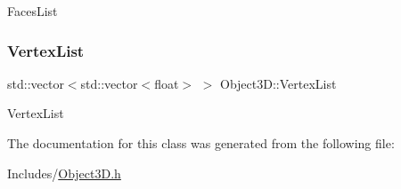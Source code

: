 Faces\+List \mbox{\label{class_object3_d_a45805c0be9963e17c592e5f5c2b972d7}} 
\subsubsection{\texorpdfstring{Vertex\+List}{VertexList}}
{\footnotesize\ttfamily std\+::vector$<$std\+::vector$<$float$>$ $>$ Object3\+D\+::\+Vertex\+List}

Vertex\+List 

The documentation for this class was generated from the following file\+:\begin{DoxyCompactItemize}
\item 
Includes/\mbox{\hyperlink{_object3_d_8h}{Object3\+D.\+h}}\end{DoxyCompactItemize}
